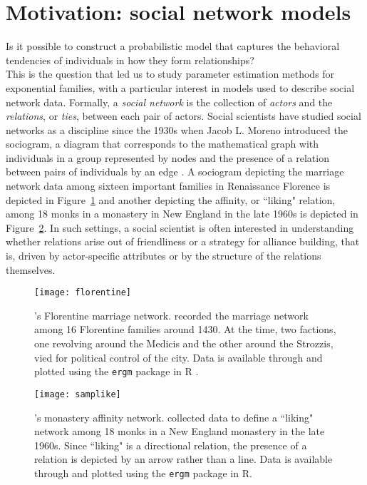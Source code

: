 \section{Motivation: social network models}
Is it possible to construct a probabilistic model that captures the 
behavioral tendencies of individuals in how they form relationships?\\  %

This is the question that led us to study parameter estimation methods for exponential 
families, with a particular interest in models used to describe social network data.  
Formally, a \emph{social network} is the collection of \emph{actors} and the 
\emph{relations}, or \emph{ties}, between each pair of actors.
Social scientists have studied social networks as a discipline since the 
1930s when Jacob L. Moreno introduced the sociogram, a diagram that corresponds to
the mathematical graph with individuals in a group 
represented by nodes and the presence of a relation between 
pairs of individuals by an edge \citep[Chapter 3]{Wasserman:1994}.  
A sociogram depicting the marriage network data among sixteen 
important families in Renaissance Florence \citep{Padgett} is depicted in 
Figure~\ref{F:Florentine} and another depicting the affinity, or ``liking" relation, among 18 
monks in a monastery in New England in the late 1960s \citep{Sampson} is depicted in 
Figure~\ref{F:Sampson}.  In such settings, a social scientist is often interested in 
understanding whether relations arise out of friendliness or a strategy for alliance 
building, that is, driven by actor-specific attributes or by the structure of  the relations themselves.
\begin{figure}[h!]
\begin{center}
\texttt{[image: florentine]} %
\end{center}
\caption[\citeauthor{Padgett}'s \citeyearpar{Padgett} Florentine marriage network]{
\citeauthor{Padgett}'s \citeyearpar{Padgett} Florentine marriage network.  \citeauthor{Padgett} recorded the marriage network among 16 Florentine families around 1430.  At the time, two factions, one revolving around the 
Medicis and the other around the Strozzis, vied for political control of the city.   
Data is available through and plotted using the \texttt{ergm} package \citep*{ergm:R} in 
R \citep*{R}.}
\label{F:Florentine}
\end{figure}

\begin{figure}[h!]
\begin{center}
\texttt{[image: samplike]} %
\end{center}
\caption[\citeauthor{Sampson}'s \citeyearpar{Sampson} monastery affinity network]
{\citeauthor{Sampson}'s \citeyearpar{Sampson} monastery affinity network.  \citeauthor{Sampson} collected data to define a ``liking" network among 18 monks 
in a New England monastery in the late 1960s.  Since ``liking" is a directional 
relation, the presence of a relation is depicted by an arrow rather than a line.  Data 
is available through and plotted using the \texttt{ergm} package \citep{ergm:R} in R.}
\label{F:Sampson}
\end{figure}

